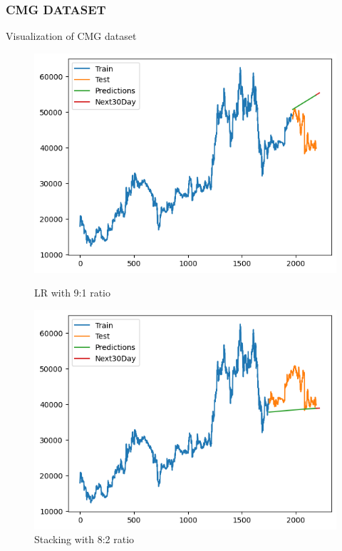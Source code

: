 \documentclass[conference]{IEEEtran}
\begin{document}
\subsubsection{CMG DATASET}  {Visualization of CMG dataset}

\begin{figure}[H]
    \centering
    \begin{minipage}{0.24\textwidth}
        \centering
        \includegraphics[width=\textwidth]{Figure/CMG/linear91.png}
        \caption{LR with 9:1 ratio}
        \label{fig:image1}
    \end{minipage}
    \hfill
    \begin{minipage}{0.24\textwidth}
        \centering
        \includegraphics[width=\textwidth]{Figure/CMG/stacking82.png}
        \caption{Stacking with 8:2 ratio}
        \label{fig:image2}
    \end{minipage}
\end{figure}
\end{document}
